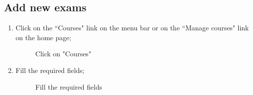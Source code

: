 \documentclass[ManualeUtente]{subfiles}
\begin{document}
	\subsection{Add new exams}
	\begin{enumerate}
		\item Click on the \textquotedblleft Courses" link on the menu bar or on the \textquotedblleft Manage courses" link on the home page;
		\begin{figure}[H]
			\centering
			\caption{Click on "Courses"}
			\label{fig:Click on "Courses"}
		\end{figure} \newpage
		\item Fill the required fields;
		\begin{figure}[H]
			\centering
			\caption{Fill the required fields}
			\label{fig:Fill the required fields}
		\end{figure}

\end{enumerate}
\end{document}
